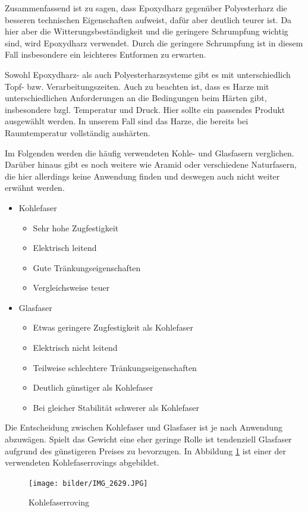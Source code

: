 \documentclass[paper=A4,pagesize,DIV=18, 12pt,listof=totoc,bibliography=totoc,headings=optiontohead,open=any]{article}
\begin{document}
Zusammenfassend ist zu sagen, dass Epoxydharz gegenüber Polyesterharz die besseren technischen Eigenschaften aufweist, dafür aber deutlich teurer ist. Da hier aber die Witterungsbeständigkeit und die geringere Schrumpfung wichtig sind, wird Epoxydharz verwendet. Durch die geringere Schrumpfung ist in diesem Fall insbesondere ein leichteres Entformen zu erwarten.

Sowohl Epoxydharz- als auch Polyesterharzsysteme gibt es mit unterschiedlich Topf- bzw. Verarbeitungszeiten. Auch zu beachten ist, dass es Harze mit unterschiedlichen Anforderungen an die Bedingungen beim Härten gibt, insbesondere bzgl. Temperatur und Druck. Hier sollte ein passendes Produkt ausgewählt werden. In unserem Fall sind das Harze, die bereits bei Raumtemperatur vollständig aushärten.

Im Folgenden werden die häufig verwendeten Kohle- und Glasfasern verglichen. Darüber hinaus gibt es noch weitere wie Aramid oder verschiedene Naturfasern, die hier allerdings keine Anwendung finden und deswegen auch nicht weiter erwähnt werden.

\begin{itemize}
	\item Kohlefaser
	\begin{itemize}
		\item Sehr hohe Zugfestigkeit
		\item Elektrisch leitend
		\item Gute Tränkungseigenschaften
		\item Vergleichsweise teuer
	\end{itemize}
	\item Glasfaser
	\begin{itemize}
		\item Etwas geringere Zugfestigkeit als Kohlefaser
		\item Elektrisch nicht leitend
		\item Teilweise schlechtere Tränkungseigenschaften
		\item Deutlich günstiger als Kohlefaser
		\item Bei gleicher Stabilität schwerer als Kohlefaser
	\end{itemize}
\end{itemize}

Die Entscheidung zwischen Kohlefaser und Glasfaser ist je nach Anwendung abzuwägen. Spielt das Gewicht eine eher geringe Rolle ist tendenziell Glasfaser aufgrund des günstigeren Preises zu bevorzugen. 
In Abbildung \ref{fig:roving} ist einer der verwendeten Kohlefaserrovings abgebildet. \cite{r_g_handbuch}
\begin{figure}[H]
	\centering
	\texttt{[image: bilder/IMG\_2629.JPG]}
	\caption{Kohlefaserroving} 
	\label{fig:roving}
\end{figure}
\end{document}
